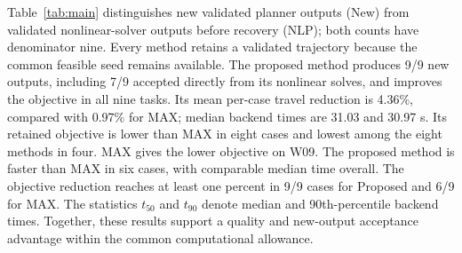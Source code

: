 Table~\ref{tab:main} distinguishes new validated planner outputs (New) from validated nonlinear-solver outputs before recovery (NLP); both counts have denominator nine. Every method retains a validated trajectory because the common feasible seed remains available. The proposed method produces 9/9 new outputs, including 7/9 accepted directly from its nonlinear solves, and improves the objective in all nine tasks. Its mean per-case travel reduction is 4.36\%, compared with 0.97\% for MAX; median backend times are 31.03 and 30.97 s. Its retained objective is lower than MAX in eight cases and lowest among the eight methods in four. MAX gives the lower objective on W09. The proposed method is faster than MAX in six cases, with comparable median time overall.
The objective reduction reaches at least one percent in 9/9 cases for Proposed and 6/9 for MAX. The statistics $t_{50}$ and $t_{90}$ denote median and 90th-percentile backend times. Together, these results support a quality and new-output acceptance advantage within the common computational allowance.
